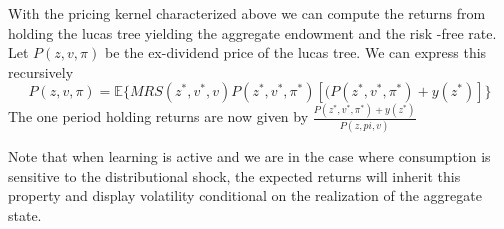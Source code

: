 \documentclass[12pt]{article}
\begin{document}

\noindent With the pricing kernel characterized above we can compute the returns from holding the lucas tree yielding the aggregate endowment and the risk -free rate. Let $P(z,v,\pi)$ be the ex-dividend price of the lucas tree. We can express this recursively
\begin{equation}
P(z,v,\pi) =\mathbb{E}\{MRS(z^*,v^*,v)P(z^*,v^*,\pi^*) [(P(z^*,v^*,\pi^*)+y(z^*)]\}
\label{eq:PriceOfLucasTree}
\end{equation}
\noindent The one period holding returns are now given by $\frac{P(z^*,v^*,\pi^*) +y(z^*)}{P(z,pi,v)}$

Note that when learning is active and we are in the case where consumption is sensitive to the distributional shock, the expected returns will inherit this property and display volatility conditional on the realization of the aggregate state.


%
\end{document}
